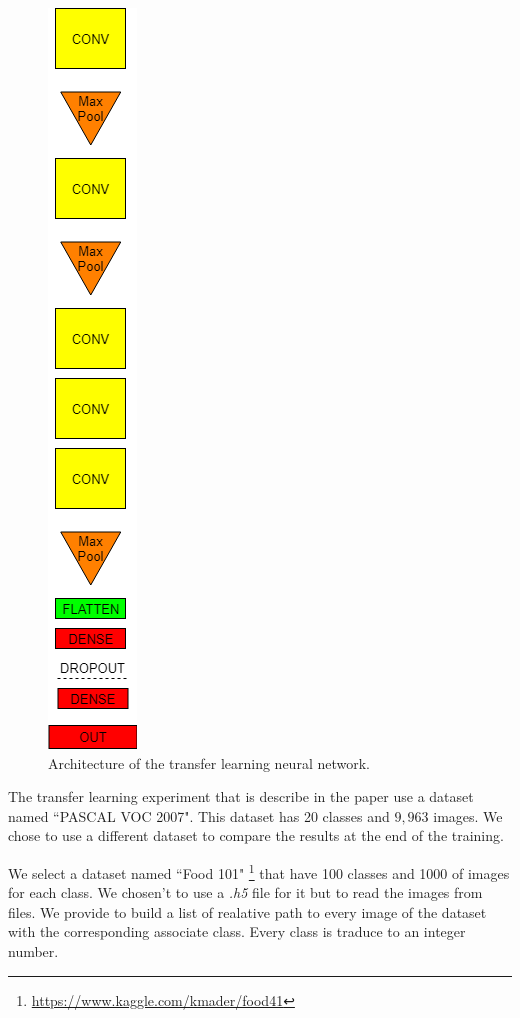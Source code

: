 \begin{figure}[!ht]
	\centering
	\includegraphics[scale=0.26]{images/FT_net.png}
	\caption{Architecture of the transfer learning neural network.}
	\label{fig:FT_net}
\end{figure}

The transfer learning experiment that is describe in the paper use a dataset named \textquotedblleft PASCAL VOC 2007". This dataset has 20 classes and $9,963$ images. We chose to use a different dataset to compare the results at the end of the training.

We select a dataset named \textquotedblleft Food 101" \footnote{\url{https://www.kaggle.com/kmader/food41}} that have 100 classes and 1000 of images for each class. We chosen't to use a \textit{.h5} file for it but to read the images from files. We provide to build a list of realative path to every image of the dataset with the corresponding associate class. Every class is traduce to an integer number. 

